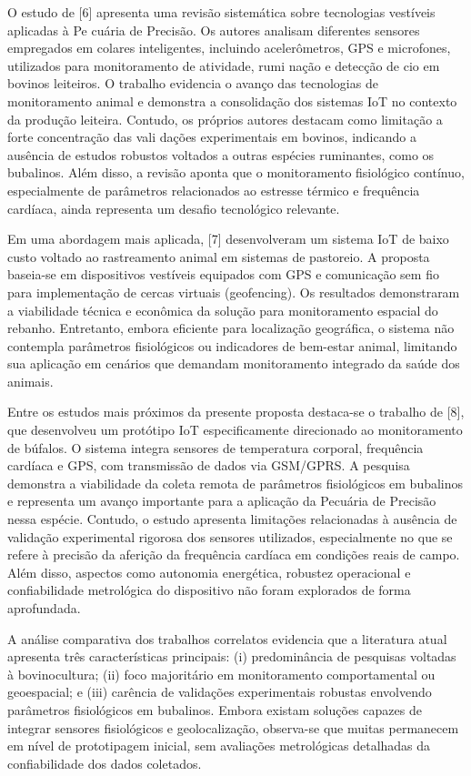 \documentclass[11pt,a4paper]{article}
\begin{document}
O estudo de [6] apresenta uma revisão sistemática sobre tecnologias vestíveis aplicadas à Pe
cuária de Precisão. Os autores analisam diferentes sensores empregados em colares inteligentes,
incluindo acelerômetros, GPS e microfones, utilizados para monitoramento de atividade, rumi
nação e detecção de cio em bovinos leiteiros. O trabalho evidencia o avanço das tecnologias de
monitoramento animal e demonstra a consolidação dos sistemas IoT no contexto da produção
leiteira. Contudo, os próprios autores destacam como limitação a forte concentração das vali
dações experimentais em bovinos, indicando a ausência de estudos robustos voltados a outras
espécies ruminantes, como os bubalinos. Além disso, a revisão aponta que o monitoramento
fisiológico contínuo, especialmente de parâmetros relacionados ao estresse térmico e frequência
cardíaca, ainda representa um desafio tecnológico relevante.

Em uma abordagem mais aplicada, [7] desenvolveram um sistema IoT de baixo custo voltado
ao rastreamento animal em sistemas de pastoreio. A proposta baseia-se em dispositivos vestíveis
equipados com GPS e comunicação sem fio para implementação de cercas virtuais (geofencing).
Os resultados demonstraram a viabilidade técnica e econômica da solução para monitoramento
espacial do rebanho. Entretanto, embora eficiente para localização geográfica, o sistema não
contempla parâmetros fisiológicos ou indicadores de bem-estar animal, limitando sua aplicação
em cenários que demandam monitoramento integrado da saúde dos animais.

Entre os estudos mais próximos da presente proposta destaca-se o trabalho de [8], que desenvolveu um protótipo IoT especificamente direcionado ao monitoramento de búfalos. O sistema
integra sensores de temperatura corporal, frequência cardíaca e GPS, com transmissão de dados
via GSM/GPRS. A pesquisa demonstra a viabilidade da coleta remota de parâmetros fisiológicos
em bubalinos e representa um avanço importante para a aplicação da Pecuária de Precisão nessa
espécie. Contudo, o estudo apresenta limitações relacionadas à ausência de validação experimental rigorosa dos sensores utilizados, especialmente no que se refere à precisão da aferição da
frequência cardíaca em condições reais de campo. Além disso, aspectos como autonomia energética, robustez operacional e confiabilidade metrológica do dispositivo não foram explorados de
forma aprofundada.

A análise comparativa dos trabalhos correlatos evidencia que a literatura atual apresenta
três características principais: (i) predominância de pesquisas voltadas à bovinocultura; (ii) foco majoritário em monitoramento comportamental ou geoespacial; e (iii) carência de validações experimentais robustas envolvendo parâmetros fisiológicos em bubalinos. Embora existam
soluções capazes de integrar sensores fisiológicos e geolocalização, observa-se que muitas permanecem em nível de prototipagem inicial, sem avaliações metrológicas detalhadas da confiabilidade dos dados coletados.
\end{document}
